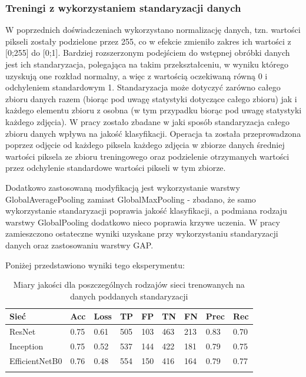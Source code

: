 \documentclass[polish,12pt]{aghthesis}
\begin{document}
\subsubsection{Treningi z wykorzystaniem standaryzacji danych}
\par
W poprzednich doświadczeniach wykorzystano normalizację danych, tzn. wartości pikseli zostały podzielone przez 255, co w efekcie zmieniło zakres ich wartości z [0;255] do [0;1]. Bardziej rozszerzonym podejściem do wstępnej obróbki danych jest ich standaryzacja, polegająca na takim przekształceniu, w wyniku którego uzyskują one rozkład normalny, a więc z wartością oczekiwaną równą 0 i odchyleniem standardowym 1. Standaryzacja może dotyczyć zarówno całego zbioru danych razem (biorąc pod uwagę statystyki dotyczące całego zbioru) jak i każdego elementu zbioru z osobna (w tym przypadku biorąc pod uwagę statystyki każdego zdjęcia). W pracy zostało zbadane w jaki sposób standaryzacja całego zbioru danych wpływa na jakość klasyfikacji. Operacja ta została przeprowadzona poprzez odjęcie od każdego piksela każdego zdjęcia w zbiorze danych średniej wartości piksela ze zbioru treningowego oraz podzielenie otrzymanych wartości przez odchylenie standardowe wartości pikseli w tym zbiorze.
\par Dodatkowo zastosowaną modyfikacją jest wykorzystanie warstwy GlobalAveragePooling zamiast GlobalMaxPooling - zbadano, że samo wykorzystanie standaryzacji poprawia jakość klasyfikacji, a podmiana rodzaju warstwy GlobalPooling dodatkowo nieco poprawia krzywe uczenia. W pracy zamieszczono ostateczne wyniki uzyskane przy wykorzystaniu standaryzacji danych oraz zastosowaniu warstwy GAP.
\vspace{2mm}
\par\noindent Poniżej przedstawiono wyniki tego eksperymentu:
\renewcommand{\arraystretch}{1.67}
 \begin{longtable}[h!]{|m{2.6cm}|m{1.2cm}|m{1.2cm}|m{1.2cm}|m{1.2cm}|m{1.2cm}|m{1.2cm}|m{1.2cm}|m{1.2cm}|}
 \hline
 Sieć & Acc & Loss & TP & FP & TN & FN & Prec & Rec\\
 \hline
 ResNet & 0.75 & 0.61 & 505 & 103 & 463 & 213 & 0.83 & 0.70\\
 \hline
 Inception & 0.75 & 0.52 & 537 & 144 & 422 & 181 & 0.79 & 0.75\\
 \hline
 EfficientNetB0 & 0.76 & 0.48 & 554 & 150 & 416 & 164 & 0.79 & 0.77\\
 \hline
\caption{Miary jakości dla poszczególnych rodzajów sieci trenowanych na danych poddanych standaryzacji}
\label{table:42}
\end{longtable}
\end{document}
